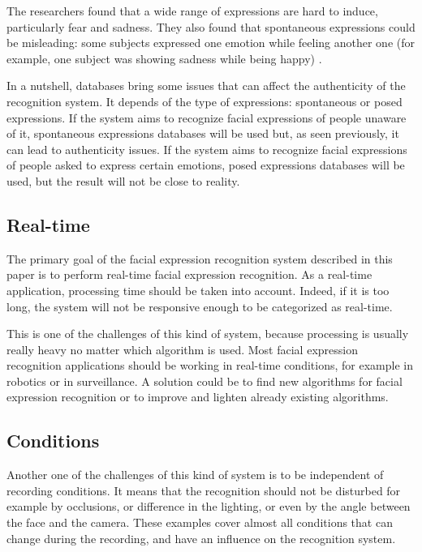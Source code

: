 \noindent The researchers found that a wide range of expressions are hard to induce, particularly fear and sadness. They also found that spontaneous expressions could be misleading: some subjects expressed one emotion while feeling another one (for example, one subject was showing sadness while being happy) \cite{SEB07}.
\newline

\noindent In a nutshell, databases bring some issues that can affect the authenticity of the recognition system. It depends of the type of expressions: spontaneous or posed expressions. If the system aims to recognize facial expressions of people unaware of it, spontaneous expressions databases will be used but, as seen previously, it can lead to authenticity issues. If the system aims to recognize facial expressions of people asked to express certain emotions, posed expressions databases will be used, but the result will not be close to reality.
\newline

\subsection{Real-time}

\vspace{\baselineskip}
\noindent The primary goal of the facial expression recognition system described in this paper is to perform real-time facial expression recognition. As a real-time application, processing time should be taken into account. Indeed, if it is too long, the system will not be responsive enough to be categorized as real-time.
\newline

\noindent This is one of the challenges of this kind of system, because processing is usually really heavy no matter which algorithm is used. Most facial expression recognition applications should be working in real-time conditions, for example in robotics or in surveillance. A solution could be to find new algorithms for facial expression recognition or to improve and lighten already existing algorithms.
\newline

\subsection{Conditions}

\vspace{\baselineskip}
\noindent Another one of the challenges of this kind of system is to be independent of recording conditions. It means that the recognition should not be disturbed for example by occlusions, or difference in the lighting, or even by the angle between the face and the camera. These examples cover almost all conditions that can change during the recording, and have an influence on the recognition system. 
\newline


